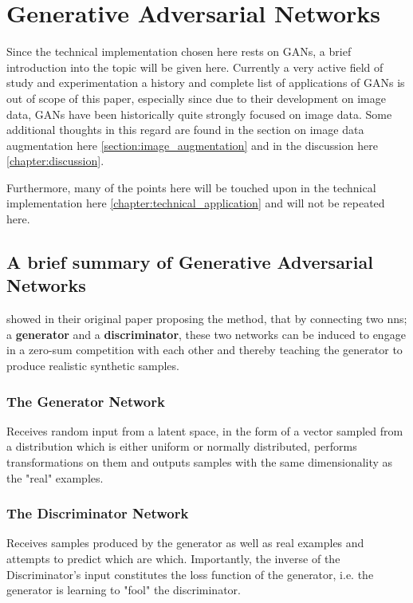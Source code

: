 \chapter{Generative Adversarial Networks}
\label{chapter:gan}

Since the technical implementation chosen here rests on \acp{GAN}, a brief introduction into the topic will be given here. Currently a very active field of study and experimentation a history and complete list of applications of \acp{GAN} is out of scope of this paper, especially since due to their development on image data, \acp{GAN} have been historically quite strongly focused on image data. Some additional thoughts in this regard are found in the section on image data augmentation here \ref{section:image_augmentation} and in the discussion here \ref{chapter:discussion}.

Furthermore, many of the points here will be touched upon in the technical implementation here \ref{chapter:technical_application} and will not be repeated here.

\pagebreak

\section{A brief summary of Generative Adversarial Networks}

\cite{goodfellow2014generative} showed in their original paper proposing the method, that by connecting two \acp{nn}; a \textbf{generator} and a \textbf{discriminator}, these two networks can be induced to engage in a zero-sum competition with each other and thereby teaching the generator to produce realistic synthetic samples. 

\subsection{The Generator Network}

Receives random input from a latent space, in the form of a vector sampled from a distribution which is either uniform or normally distributed, performs transformations on them and outputs samples with the same dimensionality as the "real" examples.

\subsection{The Discriminator Network}

Receives samples produced by the generator as well as real examples and attempts to predict which are which. Importantly, the inverse of the Discriminator's input constitutes the loss function of the generator, i.e. the generator is learning to "fool" the discriminator.

